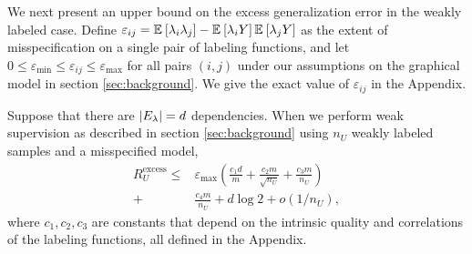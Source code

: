 We next present an upper bound on the excess generalization error in the weakly labeled case. Define $\varepsilon_{ij} = \mathbb{E}_{}\left[\lambda_i \lambda_j\right] - \mathbb{E}_{}\left[\lambda_i Y\right] \mathbb{E}_{}\left[\lambda_j Y\right]$ as the extent of misspecification on a single pair of labeling functions, and let $0 \le \varepsilon_{\min} \le \varepsilon_{ij} \le \varepsilon_{\max}$ for all pairs $(i, j)$ under our assumptions on the graphical model in section \ref{sec:background}. We give the exact value of $\varepsilon_{ij}$ in the Appendix. 
\begin{theorem}
Suppose that there are $|E_{\lambda}| = d$ dependencies. When we perform weak supervision as described in section \ref{sec:background} using $n_U$ weakly labeled samples and a misspecified model, 
\begin{align}
    R_U^{\mathrm{excess}} \le  &\varepsilon_{\max} \left(\frac{c_1 d}{m} + \frac{c_2 m}{\sqrt{n_U}} + \frac{c_3 m}{n_U}\right) \\
    + &\frac{c_4 m}{n_U} + d \log 2 + o(1/n_U), \nonumber
\end{align}
where $c_1, c_2, c_3$ are constants that depend on the intrinsic quality and correlations of the labeling functions, all defined in the Appendix. 
\label{thm:unlabeled}
\end{theorem}

